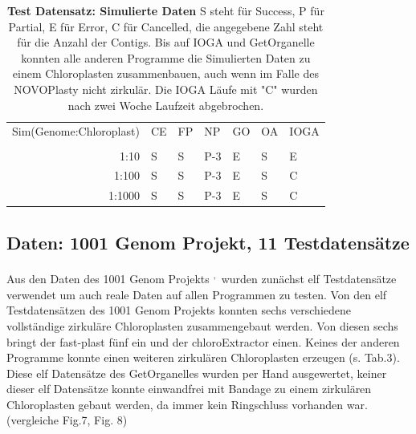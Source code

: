 \documentclass{scrartcl}
\begin{document}
\begin{table}[!h]
\caption[Test Datensatz: Simulierte Daten]{\textbf{Test Datensatz: Simulierte Daten} S steht für Success, P für Partial, E für Error, C für Cancelled, die angegebene Zahl steht für die Anzahl der Contigs. Bis auf IOGA und GetOrganelle konnten alle anderen Programme die Simulierten Daten zu einem Chloroplasten zusammenbauen, auch wenn im Falle des NOVOPlasty nicht zirkulär. Die IOGA Läufe mit "C" wurden nach zwei Woche Laufzeit abgebrochen.}
\begin{center}
\begin{tabular}{rllllll}
Sim(Genome:Chloroplast) & CE & FP & NP & GO & OA & IOGA\\
 &  &  &  &  &  & \\
\hline
1:10 & S & S & P-3 & E & S & E\\
1:100 & S & S & P-3 & E & S & C\\
1:1000 & S & S & P-3 & E & S & C\\
\end{tabular}
\end{center}
\end{table}

\subsection{Daten: 1001 Genom Projekt, 11 Testdatensätze}
\label{sec-4-3}
Aus den Daten des 1001 Genom Projekts \footnotemark[44]{}\textsuperscript{,}\,\footnotemark[7]{} wurden zunächst elf Testdatensätze verwendet um auch reale Daten auf allen Programmen zu testen.
Von den elf Testdatensätzen des 1001 Genom Projekts konnten sechs verschiedene vollständige zirkuläre Chloroplasten zusammengebaut werden. Von diesen
sechs bringt der fast-plast fünf ein und der chloroExtractor einen. Keines der anderen Programme konnte einen weiteren 
zirkulären Chloroplasten erzeugen (s. Tab.3). Diese elf Datensätze des GetOrganelles wurden per Hand ausgewertet, keiner dieser elf Datensätze konnte einwandfrei mit Bandage
zu einem zirkulären Chloroplasten gebaut werden, da immer kein Ringschluss vorhanden war. (vergleiche Fig.7, Fig. 8)
\end{document}
